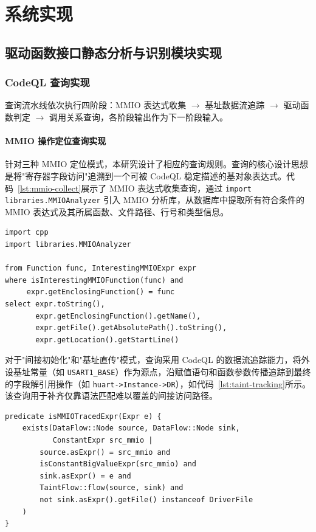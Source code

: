 \chapter{系统实现}
\label{chap:implementation}

\section{驱动函数接口静态分析与识别模块实现}

\subsection{CodeQL 查询实现}

查询流水线依次执行四阶段：MMIO 表达式收集 $\to$ 基址数据流追踪 $\to$ 驱动函数判定 $\to$ 调用关系查询，各阶段输出作为下一阶段输入。

\subsubsection{MMIO 操作定位查询实现}

针对三种 MMIO 定位模式，本研究设计了相应的查询规则。查询的核心设计思想是将"寄存器字段访问"追溯到一个可被 CodeQL 稳定描述的基对象表达式。代码~\ref{lst:mmio-collect}展示了 MMIO 表达式收集查询，通过 \texttt{import libraries.MMIOAnalyzer} 引入 MMIO 分析库，从数据库中提取所有符合条件的 MMIO 表达式及其所属函数、文件路径、行号和类型信息。

\begin{lstlisting}[style=CodeQL,language=CodeQL, caption={MMIO表达式收集查询示例},label=lst:mmio-collect]
import cpp
import libraries.MMIOAnalyzer

from Function func, InterestingMMIOExpr expr
where isInterestingMMIOFunction(func) and
     expr.getEnclosingFunction() = func
select expr.toString(),
       expr.getEnclosingFunction().getName(),
       expr.getFile().getAbsolutePath().toString(),
       expr.getLocation().getStartLine()
\end{lstlisting}

对于"间接初始化"和"基址直传"模式，查询采用 CodeQL 的数据流追踪能力，将外设基址常量（如 \texttt{USART1\_BASE}）作为源点，沿赋值语句和函数参数传播追踪到最终的字段解引用操作（如 \texttt{huart->Instance->DR}），如代码~\ref{lst:taint-tracking}所示。该查询用于补齐仅靠语法匹配难以覆盖的间接访问路径。

\begin{lstlisting}[style=CodeQL,language=CodeQL, caption={常量基址数据流追踪查询示例},label=lst:taint-tracking]
predicate isMMIOTracedExpr(Expr e) {
    exists(DataFlow::Node source, DataFlow::Node sink,
           ConstantExpr src_mmio |
        source.asExpr() = src_mmio and
        isConstantBigValueExpr(src_mmio) and
        sink.asExpr() = e and
        TaintFlow::flow(source, sink) and
        not sink.asExpr().getFile() instanceof DriverFile
    )
}
\end{lstlisting}

